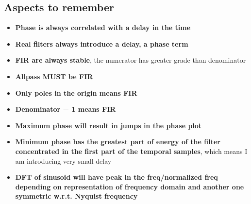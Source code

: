 \subsection{Aspects to remember}
\begin{itemize}
    \item \textbf{Phase is always correlated with a delay in the time}
    \item \textbf{Real filters always introduce a delay, a phase term}
    \item \textbf{FIR are always stable}, the numerator has greater grade than denominator
    \item \textbf{Allpass MUST be FIR}
    \item \textbf{Only poles in the origin means FIR}
    \item \textbf{Denominator = 1 means FIR}
    \item \textbf{Maximum phase will result in jumps in the phase plot}
    \item \textbf{Minimum phase has the greatest part of energy of the filter concentrated in the first part of the temporal samples}, which means I am introducing very small delay
    \item \textbf{DFT of sinusoid will have peak in the freq/normalized freq depending on representation of frequency domain and another one symmetric w.r.t. Nyquist frequency}
\end{itemize}

